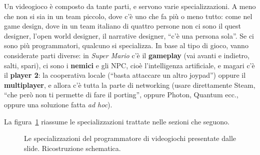 Un videogioco è composto da tante parti, e servono varie specializzazioni. A
meno che non si sia in un team piccolo, dove c'è uno che fa più o meno tutto:
come nel game design, dove in un team italiano di quattro persone non ci sono
il quest designer, l'open world designer, il narrative designer, ``c'è una
persona sola''. Se ci sono più programmatori, qualcuno si specializza. In base
al tipo di gioco, vanno considerate parti diverse: in \emph{Super Mario} c'è il
\textbf{gameplay} (vai avanti e indietro, salti, spari), ci sono i
\textbf{nemici} e gli NPC, cioè l'intelligenza artificiale, e magari c'è il
\textbf{player 2}: la cooperativa locale (``basta attaccare un altro joypad'')
oppure il \textbf{multiplayer}, e allora c'è tutta la parte di networking
(usare direttamente Steam, ``che però non ti permette di fare il porting'',
oppure Photon, Quantum ecc., oppure una soluzione fatta \emph{ad hoc}).

La figura~\ref{p5:fig:specializzazioni} riassume le specializzazioni
trattate nelle sezioni che seguono.

\begin{figure}[htbp]
\centering
{}
\caption{Le specializzazioni del programmatore di videogiochi presentate
dalle slide. Ricostruzione schematica.}
\label{p5:fig:specializzazioni}
\end{figure}

